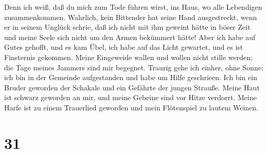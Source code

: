  Denn ich weiß, daß du mich zum Tode führen wirst, ins
Haus, wo alle Lebendigen zusammenkommen.  Wahrlich, kein
Bittender hat seine Hand ausgestreckt, wenn er in seinem Unglück schrie,
 daß ich nicht mit ihm geweint hätte in böser Zeit und
meine Seele sich nicht um den Armen bekümmert hätte! 
Aber ich habe auf Gutes gehofft, und es kam Übel, ich habe auf das Licht
gewartet, und es ist Finsternis gekommen.  Meine
Eingeweide wallen und wollen nicht stille werden; die Tage meines
Jammers sind mir begegnet.  Traurig gehe ich einher, ohne
Sonne; ich bin in der Gemeinde aufgestanden und habe um Hilfe
geschrieen.  Ich bin ein Bruder geworden der Schakale und
ein Gefährte der jungen Strauße.  Meine Haut ist schwarz
geworden an mir, und meine Gebeine sind vor Hitze verdorrt.
 Meine Harfe ist zu einem Trauerlied geworden und mein
Flötenspiel zu lautem Weinen.

\hypertarget{section-30}{%
\section{31}\label{section-30}}

